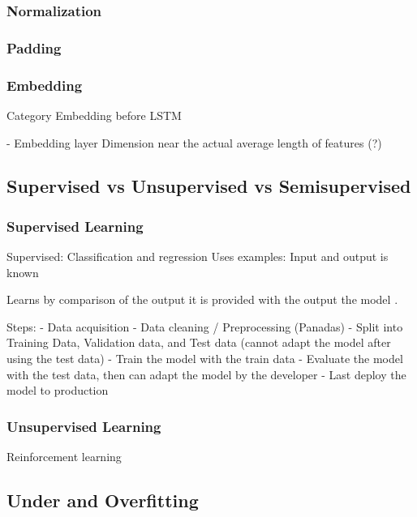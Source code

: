 \subsubsection{Normalization}



\subsubsection{Padding}

\subsubsection{Embedding}

Category Embedding before LSTM


- Embedding layer
Dimension near the actual average length of features (?)

\subsection{Supervised vs Unsupervised vs Semisupervised}

\subsubsection{Supervised Learning}
Supervised: Classification and regression
Uses  examples: Input and output is known

Learns by comparison of the output it is provided with the output the model .

Steps:
- Data acquisition
- Data cleaning / Preprocessing (Panadas)
- Split into Training Data, Validation data, and Test data (cannot adapt the model after using the test data)
- Train the model with the train data
- Evaluate the model with the test data, then can adapt the model by the developer
- Last deploy the model to production

\subsubsection{Unsupervised Learning}
Reinforcement learning
\subsection{Under and Overfitting}
